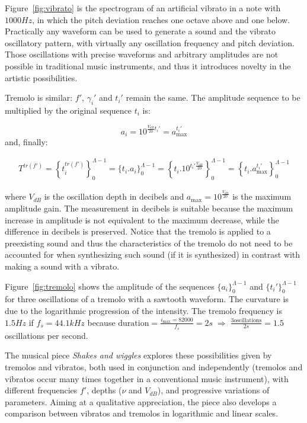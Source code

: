 Figure~\ref{fig:vibrato} is the spectrogram of an artificial vibrato in a note with $1000Hz$,
in which the pitch deviation reaches one octave above and one below.
Practically any waveform can be used to generate a sound and the vibrato oscillatory pattern, with virtually any oscillation frequency and pitch deviation.
Those oscillations with precise waveforms and arbitrary amplitudes are not possible in traditional music instruments, and thus it introduces novelty in the artistic possibilities.

Tremolo is similar: $f'$, $\gamma_i'$ and $t_i'$ remain the same.
The amplitude sequence to be multiplied by the original sequence $t_i$ is:

\begin{equation}\label{trA}
 a_i=10^{\frac{V_{dB}}{20}t_i' } = a_{\text{max}}^{t_i'}
\end{equation}
\noindent and, finally: 

\begin{equation}\label{trT}
\begin{split}
 T^{tr(f')}=\left \{ t_i^{tr(f')} \right \}_0^{\Lambda-1}=\{ t_i . a_i \}_0^{\Lambda-1}= \left \{t_i .10^{t_i' \frac{V_{dB}}{20}}    \right \}_0^{\Lambda-1}=\left\{t_i . a_{\text{max}}^{t_i'} \right\}_0^{\Lambda-1}
\end{split}
\end{equation}

\noindent where $V_{dB}$ is the oscillation depth in decibels and $a_{\text{max}}=10^{\frac{V_{dB}}{20}}$ is the maximum amplitude gain.
The measurement in decibels is suitable because the maximum increase in amplitude is not equivalent to the maximum decrease, while the difference in decibels is preserved.
Notice that the tremolo is applied to a preexisting sound and
thus the characteristics of the tremolo do not need to be accounted for
when synthesizing such sound (if it is synthesized)
in contrast with making a sound with a vibrato.

Figure~\ref{fig:tremolo} shows the amplitude of the sequences $\{a_i\}_0^{\Lambda-1}$ and $\{t_i'\}_0^{\Lambda-1}$ for three oscillations of a tremolo with a sawtooth waveform. The curvature is due to the logarithmic progression of the intensity. The tremolo frequency is $1.5Hz$ if $f_s=44.1kHz$ because $\text{duration} = \frac{i_{\text{max}}=82000}{f_s}= 2s \; \Rightarrow \; \frac{3\text{oscillations}}{2s}=1.5$ oscillations per second.

The musical piece \emph{Shakes and wiggles} explores these possibilities given by tremolos and vibratos,
both used in conjunction and independently (tremolos and vibratos occur many times together in a conventional music instrument),
with different frequencies $f'$, depths ($\nu$ and $V_{dB}$),
and progressive variations of parameters.
Aiming at a qualitative appreciation,
the piece also develops a comparison between vibratos and tremolos in logarithmic and linear scales.~\cite{MASSA}

